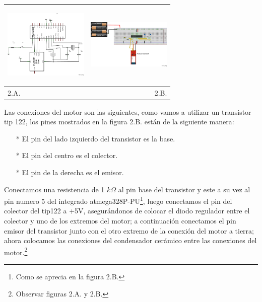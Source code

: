 \documentclass[12]{article}
\newenvironment{Figure}
{\par\medskip\noindent\minipage{\linewidth}}
{\endminipage\par\medskip}
\begin{document}
\begin{multicols}{2}
\begin{Figure}
\center
\begin{tabular}{|l|r|}
\hline
\includegraphics[width=4cm, height=4cm]{img/bluetoothesq.png} & \includegraphics[width=4cm, height=4cm]{img/bluetoothmon.png} \\ \hline
2.A. & 2.B. \\ \hline
\end{tabular}
\label{fig:g2}
\end{Figure}
\vspace{0.2cm}

Las conexiones del motor son las siguientes, como vamos a utilizar un transistor tip\cite{TIP122} 122, los pines mostrados en la figura 2.B.  están de la siguiente manera: 

\begin{enumerate}
\item[*] El pin del lado izquierdo del transistor es la base.
\item[*] El pin del centro es el colector.
\item[*] El pin de la derecha es el emisor.
\end{enumerate}

Conectamos una resistencia de 1 $k \Omega $ al pin base del transistor y este a su vez al pin numero 5 del integrado atmega328P-PU\footnote{Como se aprecia en la figura 2.B.}, luego conectamos el pin del colector del tip122 a +5V, asegurándonos de colocar el diodo regulador entre el colector y uno de los extremos del motor; a continuación conectamos el pin emisor del transistor  junto con el otro extremo de la conexión del motor a tierra; ahora colocamos las conexiones del condensador cerámico entre las conexiones del motor.\footnote{Observar figuras 2.A. y 2.B.}



\end{multicols}
\end{document}

